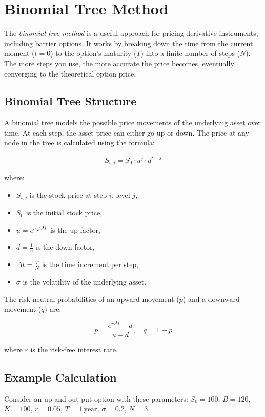 \chapter{Binomial Tree Method}
\label{sec:binomial-tree}

The \textit{binomial tree method} is a useful approach for pricing derivative instruments, including barrier options. It works by breaking down the time from the current moment (\(t = 0\)) to the option's maturity (\(T\)) into a finite number of steps (\(N\)). The more steps you use, the more accurate the price becomes, eventually converging to the theoretical option price.

\section{Binomial Tree Structure}

A binomial tree models the possible price movements of the underlying asset over time. At each step, the asset price can either go up or down. The price at any node in the tree is calculated using the formula:

\[
S_{i,j} = S_0 \cdot u^j \cdot d^{i-j}
\]

where:
\begin{itemize}
    \item \(S_{i,j}\) is the stock price at step \(i\), level \(j\),
    \item \(S_0\) is the initial stock price,
    \item \(u = e^{\sigma \sqrt{\Delta t}}\) is the up factor,
    \item \(d = \frac{1}{u}\) is the down factor,
    \item \(\Delta t = \frac{T}{N}\) is the time increment per step,
    \item \(\sigma\) is the volatility of the underlying asset.
\end{itemize}

The risk-neutral probabilities of an upward movement (\(p\)) and a downward movement (\(q\)) are:

\[
p = \frac{e^{r \Delta t} - d}{u - d}, \quad q = 1 - p
\]

where \(r\) is the risk-free interest rate.

\section{Example Calculation}

Consider an up-and-out put option with these parameters:
\(S_0 = 100\), \(B = 120\), \(K = 100\), \(r = 0.05\), \(T = 1\ \text{year}\), \(\sigma = 0.2\), \(N = 3\).

